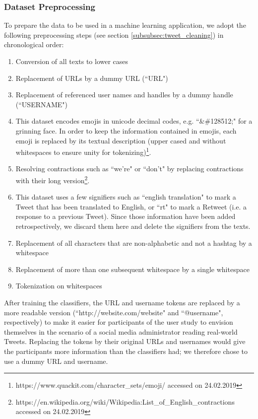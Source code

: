 \subsubsection{Dataset Preprocessing}
To prepare the data to be used in a machine learning application, we adopt the following preprocessing steps (see section \ref{subsubsec:tweet_cleaning}) in chronological order:
\begin{enumerate}
	\item Conversion of all texts to lower cases
	\item Replacement of URLs by a dummy URL (``URL")
	\item Replacement of referenced user names and handles by a dummy handle (``USERNAME")
	\item This dataset encodes emojis in unicode decimal codes, e.g. ``\&\#128512;" for a grinning face. In order to keep the information contained in emojis, each emoji is replaced by its textual description (upper cased and without whitespaces to ensure unity for tokenizing)\footnote{https://www.quackit.com/character\_sets/emoji/ accessed on 24.02.2019}.
	\item Resolving contractions such as ``we're" or ``don't" by replacing contractions with their long version\footnote{https://en.wikipedia.org/wiki/Wikipedia:List\_of\_English\_contractions accessed on 24.02.2019}.
	\item This dataset uses a few signifiers such as ``english translation" to mark a Tweet that has been translated to English, or ``rt" to mark a Retweet (i.e. a response to a previous Tweet). Since those information have been added retrospectively, we discard them here and delete the signifiers from the texts.
	\item Replacement of all characters that are non-alphabetic and not a hashtag by a whitespace
	\item Replacement of more than one subsequent whitespace by a single whitespace
	\item Tokenization on whitespaces
\end{enumerate}
After training the classifiers, the URL and username tokens are replaced by a more readable version (``http://website.com/website" and ``@username", respectively) to make it easier for participants of the user study to envision themselves in the scenario of a social media administrator reading real-world Tweets. Replacing the tokens by their original URLs and usernames would give the participants more information than the classifiers had; we therefore chose to use a dummy URL and username.\newline
